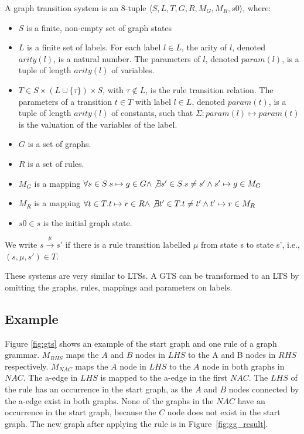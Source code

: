 \begin{definition}
A graph transition system is an 8-tuple	$\langle S, L, T, G, R, M_G, M_R, s0\rangle$, where:
\begin{itemize}
\item $S$ is a finite, non-empty set of graph states
\item $L$ is a finite set of labels. For each label $l\in L$, the arity of $l$, denoted $\mathit{arity(l)}$, is a natural number. The parameters of $l$, denoted $\mathit{param(l)}$, is a tuple of length $\mathit{arity(l)}$ of variables.
\item $T \in S \times (L \cup \{\tau\}) \times S$, with $\tau \notin L$, is the rule transition relation. The parameters of a transition $t \in T$ with label $l \in L$, denoted $\mathit{param(t)}$, is a tuple of length $\mathit{arity(l)}$ of constants, such that $\Sigma:\mathit{param(l)} \mapsto \mathit{param(t)}$ is the valuation of the variables of the label.
\item $G$ is a set of graphs.
\item $R$ is a set of rules.
\item $M_G$ is a mapping $\forall s \in S . s \mapsto g \in G \land \not\exists s' \in S . s \neq s' \land s' \mapsto g \in M_G$
\item $M_R$ is a mapping $\forall t \in T . t \mapsto r \in R \land \not\exists t' \in T . t \neq t' \land t' \mapsto r \in M_R$
\item $s0 \in s$ is the initial graph state.
\end{itemize}
We write $s \xrightarrow{\mu}s'$ if there is a rule transition labelled $\mu$ from state s to state s', i.e., $(s, \mu, s') \in T$.
\end{definition}

These systems are very similar to LTSs. A GTS can be transformed to an LTS by omitting the graphs, rules, mappings and parameters on labels.

\subsection{Example}\label{sec:gts_example}
Figure \ref{fig:gts} shows an example of the start graph and one rule of a graph grammar. $\mathit{M_{RHS}}$ maps the $A$ and $B$ nodes in $\mathit{LHS}$ to the A and B nodes in $\mathit{RHS}$ respectively. $\mathit{M_{NAC}}$ maps the $A$ node in $\mathit{LHS}$ to the $A$ node in both graphs in $\mathit{NAC}$. The a-edge in $\mathit{LHS}$ is mapped to the a-edge in the first $\mathit{NAC}$. The $\mathit{LHS}$ of the rule has an occurrence in the start graph, as the $A$ and $B$ nodes connected by the a-edge exist in both graphs. None of the graphs in the $\mathit{NAC}$ have an occurrence in the start graph, because the $C$ node does not exist in the start graph. The new graph after applying the rule is in Figure~\ref{fig:gg_result}.

